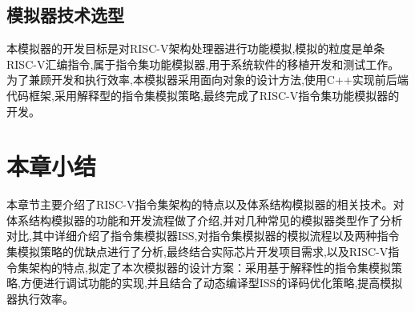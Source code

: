 
\subsection{模拟器技术选型}
本模拟器的开发目标是对RISC-V架构处理器进行功能模拟,模拟的粒度是单条RISC-V汇编指令,属于指令集功能模拟器,用于系统软件的移植开发和测试工作。为了兼顾开发和执行效率,本模拟器采用面向对象的设计方法,使用C++实现前后端代码框架,采用解释型的指令集模拟策略,最终完成了RISC-V指令集功能模拟器的开发。


\section{本章小结}
本章节主要介绍了RISC-V指令集架构的特点以及体系结构模拟器的相关技术。对体系结构模拟器的功能和开发流程做了介绍,并对几种常见的模拟器类型作了分析对比,其中详细介绍了指令集模拟器ISS,对指令集模拟器的模拟流程以及两种指令集模拟策略的优缺点进行了分析,最终结合实际芯片开发项目需求,以及RISC-V指令集架构的特点,拟定了本次模拟器的设计方案：采用基于解释性的指令集模拟策略,方便进行调试功能的实现,并且结合了动态编译型ISS的译码优化策略,提高模拟器执行效率。